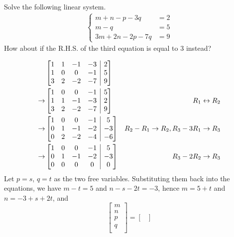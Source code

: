 \begin{Exercise}
Solve the following linear system.
\begin{align*}
\begin{cases}
m + n - p - 3q &= 2\\
m - q &= 5\\
3m + 2n - 2p - 7q &= 9
\end{cases}
\end{align*}
How about if the R.H.S. of the third equation is equal to $3$ instead?
\end{Exercise}
\begin{Answer}
\begin{align*}
&\left[
\begin{array}{@{}cccc|c@{}}
1 & 1 & -1 & -3 & 2\\
1 & 0 & 0 & -1 & 5\\
3 & 2 & -2 & -7 & 9
\end{array}
\right]\\
\to &
\left[
\begin{array}{@{}cccc|c@{}}
1 & 0 & 0 & -1 & 5\\
1 & 1 & -1 & -3 & 2\\
3 & 2 & -2 & -7 & 9
\end{array}
\right] & R_1 \leftrightarrow R_2 \\
\to &
\left[
\begin{array}{@{}cccc|c@{}}
1 & 0 & 0 & -1 & 5\\
0 & 1 & -1 & -2 & -3\\
0 & 2 & -2 & -4 & -6
\end{array}
\right] & R_2 - R_1 \to R_2, R_3 - 3R_1 \to R_3
\\
\to &
\left[
\begin{array}{@{}cccc|c@{}}
1 & 0 & 0 & -1 & 5\\
0 & 1 & -1 & -2 & -3\\
0 & 0 & 0 & 0 & 0
\end{array}
\right] & R_3 - 2R_2 \to R_3
\end{align*}
Let $p = s$, $q = t$ as the two free variables. Substituting them back into the equations, we have $m-t=5$ and $n-s-2t=-3$, hence $m=5+t$ and $n=-3+s+2t$, and
\begin{equation*}
\begin{bmatrix}
m\\
n\\
p\\
q\\
\end{bmatrix}
=
\begin{bmatrix}

\end{bmatrix}
\end{equation*}
\end{Answer}
